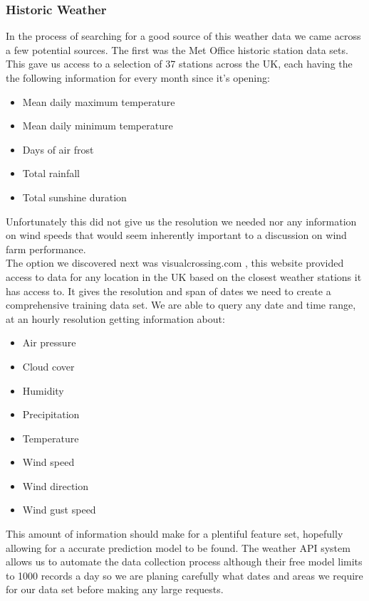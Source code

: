 \documentclass[twoside]{article}
\begin{document}
\subsubsection{Historic Weather}
In the process of searching for a good source of this weather data we came across a few potential sources. The first was the Met Office historic station data sets\cite{metoffice}. This gave us access to a selection of 37 stations across the UK, each having the the following information for every month since it's opening: \cite{metoffice}
\begin{itemize}
    \item Mean daily maximum temperature
    \item Mean daily minimum temperature
    \item Days of air frost
    \item Total rainfall 
    \item Total sunshine duration
\end{itemize}
Unfortunately this did not give us the resolution we needed nor any information on wind speeds that would seem inherently important to a discussion on wind farm performance.
\\
\noindent The option we discovered next was visualcrossing.com \cite{visualCrossing}, this website provided access to data for any location in the UK based on the closest weather stations it has access to. It gives the resolution and span of dates we need to create a comprehensive training data set. We are able to query any date and time range, at an hourly resolution getting information about:\cite{visualCrossing}
\begin{itemize}
    \item Air pressure
    \item Cloud cover
    \item Humidity
    \item Precipitation
    \item Temperature
    \item Wind speed
    \item Wind direction
    \item Wind gust speed
\end{itemize}
This amount of information should make for a plentiful feature set, hopefully allowing for a accurate prediction model to be found. The weather API system allows us to automate the data collection process although their free model limits to 1000 records a day so we are planing carefully what dates and areas we require for our data set before making any large requests.
\end{document}
